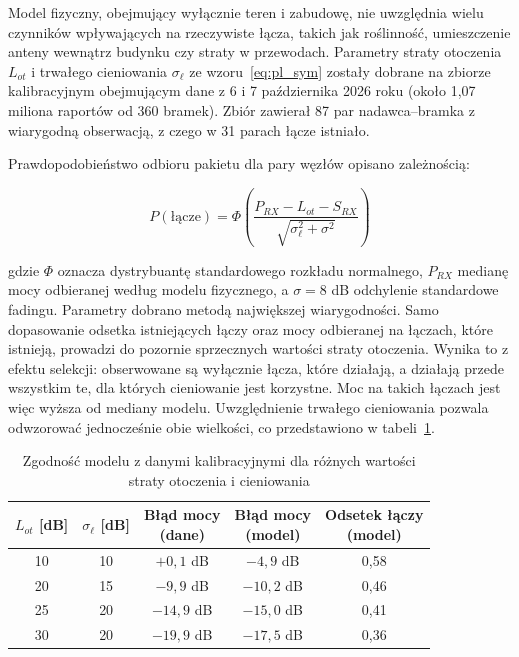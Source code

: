 Model fizyczny, obejmujący wyłącznie teren i zabudowę, nie uwzględnia wielu czynników wpływających na rzeczywiste łącza, takich jak roślinność, umieszczenie anteny wewnątrz budynku czy straty w przewodach. Parametry straty otoczenia \(L_{ot}\) i trwałego cieniowania \(\sigma_{\ell}\) ze wzoru~\eqref{eq:pl_sym} zostały dobrane na zbiorze kalibracyjnym obejmującym dane z 6 i 7 października 2026 roku (około 1,07 miliona raportów od 360 bramek). Zbiór zawierał 87 par nadawca--bramka z wiarygodną obserwacją, z czego w 31 parach łącze istniało.

Prawdopodobieństwo odbioru pakietu dla pary węzłów opisano zależnością:

\begin{equation}\label{eq:p_link}
P(\textrm{łącze}) = \Phi\left(\frac{P_{RX} - L_{ot} - S_{RX}}{\sqrt{\sigma_{\ell}^2 + \sigma^2}}\right)
\end{equation}

gdzie \(\Phi\) oznacza dystrybuantę standardowego rozkładu normalnego, \(P_{RX}\) medianę mocy odbieranej według modelu fizycznego, a \(\sigma = 8\) dB odchylenie standardowe fadingu. Parametry dobrano metodą największej wiarygodności. Samo dopasowanie odsetka istniejących łączy oraz mocy odbieranej na łączach, które istnieją, prowadzi do pozornie sprzecznych wartości straty otoczenia. Wynika to z efektu selekcji: obserwowane są wyłącznie łącza, które działają, a działają przede wszystkim te, dla których cieniowanie jest korzystne. Moc na takich łączach jest więc wyższa od mediany modelu. Uwzględnienie trwałego cieniowania pozwala odwzorować jednocześnie obie wielkości, co przedstawiono w tabeli~\ref{tab:cieniowanie}.

\begin{table}[ht]
\centering
\caption{Zgodność modelu z danymi kalibracyjnymi dla różnych wartości straty otoczenia i cieniowania}
\label{tab:cieniowanie}
\small
\begin{tabular}{|c|c|c|c|c|}
\hline
\(L_{ot}\) [dB] & \(\sigma_{\ell}\) [dB] & \shortstack{\textbf{Błąd mocy}\\\textbf{(dane)}} & \shortstack{\textbf{Błąd mocy}\\\textbf{(model)}} & \shortstack{\textbf{Odsetek łączy}\\\textbf{(model)}} \\
\hline
10 & 10 & \(+0{,}1\) dB & \(-4{,}9\) dB & 0,58 \\
20 & 15 & \(-9{,}9\) dB & \(-10{,}2\) dB & 0,46 \\
25 & 20 & \(-14{,}9\) dB & \(-15{,}0\) dB & 0,41 \\
30 & 20 & \(-19{,}9\) dB & \(-17{,}5\) dB & 0,36 \\
\hline
\end{tabular}
\end{table}

